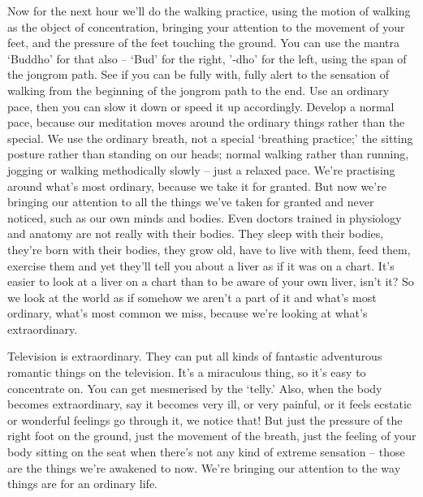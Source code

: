 
Now for the next hour we'll do the walking practice, using the motion of walking as the object of concentration, bringing your attention to the movement of your feet, and the pressure of the feet touching the ground. You can use the mantra `Buddho' for that also -- `Bud' for the right, '-dho' for the left, using the span of the jongrom path. See if you can be fully with, fully alert to the sensation of walking from the beginning of the jongrom path to the end. Use an ordinary pace, then you can slow it down or speed it up accordingly. Develop a normal pace, because our meditation moves around the ordinary things rather than the special. We use the ordinary breath, not a special `breathing practice;' the sitting posture rather than standing on our heads; normal walking rather than running, jogging or walking methodically slowly -- just a relaxed pace. We're practising around what's most ordinary, because we take it for granted. But now we're bringing our attention to all the things we've taken for granted and never noticed, such as our own minds and bodies. Even doctors trained in physiology and anatomy are not really with their bodies. They sleep with their bodies, they're born with their bodies, they grow old, have to live with them, feed them, exercise them and yet they'll tell you about a liver as if it was on a chart. It's easier to look at a liver on a chart than to be aware of your own liver, isn't it? So we look at the world as if somehow we aren't a part of it and what's most ordinary, what's most common we miss, because we're looking at what's extraordinary.

Television is extraordinary. They can put all kinds of fantastic adventurous romantic things on the television. It's a miraculous thing, so it's easy to concentrate on. You can get mesmerised by the `telly.' Also, when the body becomes extraordinary, say it becomes very ill, or very painful, or it feels ecstatic or wonderful feelings go through it, we notice that! But just the pressure of the right foot on the ground, just the movement of the breath, just the feeling of your body sitting on the seat when there's not any kind of extreme sensation -- those are the things we're awakened to now. We're bringing our attention to the way things are for an ordinary life.

